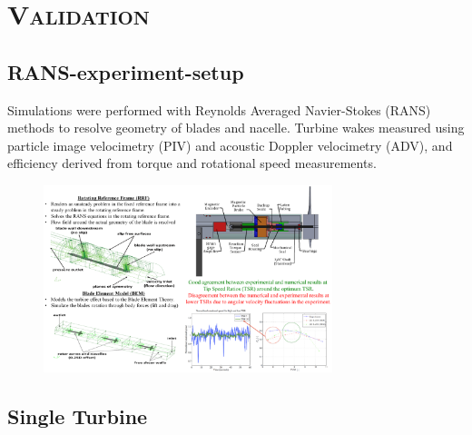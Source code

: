 \documentclass[xcolor=x11names,compress]{beamer}
\newcommand{\customfootcite}[1]{\footnote{\citeauthor{#1}, \citetitle{#1}, \citeyear{#1}}}
\begin{document}
\section{\scshape Validation}

\subsection{RANS-experiment-setup}
	
	\begin{frame}{}

		\scriptsize Simulations were performed with Reynolds Averaged Navier-Stokes (RANS) methods 
		to resolve geometry of blades and nacelle. Turbine wakes measured using
		particle image velocimetry (PIV) and acoustic Doppler velocimetry (ADV), and efficiency derived from
		torque and rotational speed measurements. 

		\vspace{-5pt}

		\begin{figure}[p]
		    \centering
		    \includegraphics[width=0.75\textwidth]{figures/validation-RANS-experiment-setup.png}
		\end{figure}

	\end{frame}


\subsection{Single Turbine}
	
\end{document}
